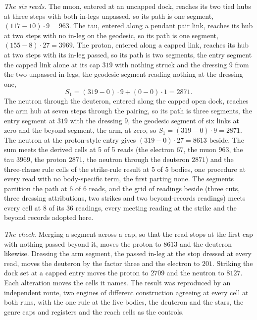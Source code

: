 \begin{chproof}
\textit{The six reads.} The muon, entered at an uncapped dock, reaches its two tied hubs at three steps with both in-legs unpassed, so its path is one segment, $(117-10)\cdot 9=963$. The tau, entered along a pendant pair link, reaches its hub at two steps with no in-leg on the geodesic, so its path is one segment, $(155-8)\cdot 27=3969$. The proton, entered along a capped link, reaches its hub at two steps with its in-leg passed, so its path is two segments, the entry segment the capped link alone at its cap $319$ with nothing struck and the dressing $9$ from the two unpassed in-legs, the geodesic segment reading nothing at the dressing one,
\begin{equation}
S_1=(319-0)\cdot 9+(0-0)\cdot 1=2871 .
\end{equation}
The neutron through the deuteron, entered along the capped open dock, reaches the arm hub at seven steps through the pairing, so its path is three segments, the entry segment at $319$ with the dressing $9$, the geodesic segment of six links at zero and the beyond segment, the arm, at zero, so $S_1=(319-0)\cdot 9=2871$. The neutron at the proton-style entry gives $(319-0)\cdot 27=8613$ beside. The sum meets the derived cells at 5 of 5 reads (the electron $67$, the muon $963$, the tau $3969$, the proton $2871$, the neutron through the deuteron $2871$) and the three-clause rule cells of the strike-rule result at 5 of 5 bodies, one procedure at every read with no body-specific term, the first parting none. The segments partition the path at 6 of 6 reads, and the grid of readings beside (three cuts, three dressing attributions, two strikes and two beyond-records readings) meets every cell at 8 of its 36 readings, every meeting reading at the strike and the beyond records adopted here.

\textit{The check.} Merging a segment across a cap, so that the read stops at the first cap with nothing passed beyond it, moves the proton to $8613$ and the deuteron likewise. Dressing the arm segment, the passed in-leg at the stop dressed at every read, moves the deuteron by the factor three and the electron to $201$. Striking the dock set at a capped entry moves the proton to $2709$ and the neutron to $8127$. Each alteration moves the cells it names. The result was reproduced by an independent route, two engines of different construction agreeing at every cell at both runs, with the one rule at the five bodies, the deuteron and the stars, the genre caps and registers and the reach cells as the controls.
\end{chproof}

